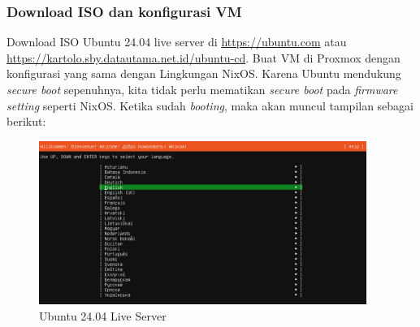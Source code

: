 \documentclass[10pt,twoside]{report}
\begin{document}
\begin{adjustwidth}{20pt}{}
	\subsubsection{Download ISO dan konfigurasi VM}
	\begin{adjustwidth}{20pt}{}
		Download ISO Ubuntu 24.04 live server di \url{https://ubuntu.com} atau
		\url{https://kartolo.sby.datautama.net.id/ubuntu-cd}. Buat VM di Proxmox
		dengan konfigurasi yang sama dengan Lingkungan NixOS. Karena Ubuntu mendukung
		\textit{secure boot} sepenuhnya, kita tidak perlu mematikan \textit{secure boot}
		pada \textit{firmware setting} seperti NixOS.
		Ketika sudah \textit{booting}, maka akan muncul tampilan sebagai berikut:
		\begin{figure}[H]
			\begin{center}
				\includegraphics[width=0.95\textwidth]{images/ansible-nix-0.png}
			\end{center}
			\caption{Ubuntu 24.04 Live Server}
		\end{figure}

	\end{adjustwidth}

\end{adjustwidth}
\end{document}

